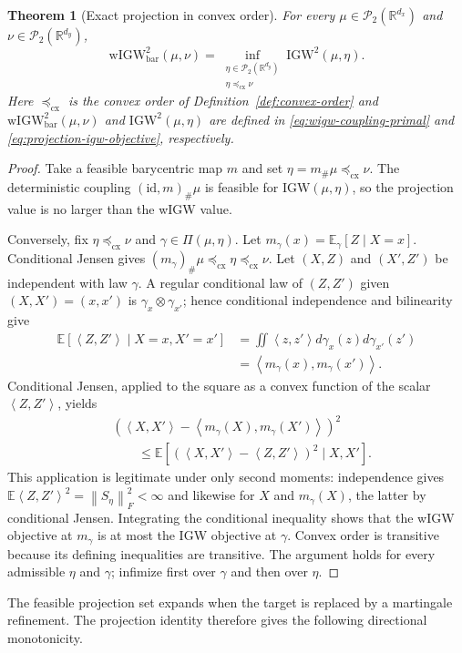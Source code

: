 \documentclass[11pt]{article}
\newcommand{\R}{\mathbb R}
\newcommand{\E}{\mathbb E}
\newcommand{\cP}{\mathcal P}
\newcommand{\ip}[2]{\left\langle #1,#2\right\rangle}
\newcommand{\norm}[1]{\left\lVert #1\right\rVert}
\newcommand{\cx}{\preceq_{\mathrm{cx}}}
\newcommand{\wIGW}{\mathrm{wIGW}_{\mathrm{bar}}}
\newcommand{\IGW}{\mathrm{IGW}}
\theoremstyle{plain}
\newtheorem{theorem}{Theorem}[section]
\theoremstyle{definition}
\theoremstyle{remark}
\begin{document}
\begin{theorem}[Exact projection in convex order]\label{thm:projection}
For every \(\mu\in\cP_2(\R^{d_x})\) and \(\nu\in\cP_2(\R^{d_y})\),
\[
  \wIGW^2(\mu,\nu)=
  \inf_{\substack{\eta\in\cP_2(\R^{d_y})\\ \eta\cx\nu}}
  \IGW^2(\mu,\eta).
\]
Here $\cx$ is the convex order of Definition~\ref{def:convex-order} and
$\wIGW^2(\mu,\nu)$ and $\IGW^2(\mu,\eta)$ are defined in
\eqref{eq:wigw-coupling-primal} and \eqref{eq:projection-igw-objective},
respectively.
\end{theorem}

\begin{proof}
Take a feasible barycentric map \(m\) and set \(\eta=m_\#\mu\cx\nu\). The
deterministic coupling \((\mathrm{id},m)_\#\mu\) is feasible for
\(\IGW(\mu,\eta)\), so the projection value is no larger than the wIGW value.

Conversely, fix \(\eta\cx\nu\) and \(\gamma\in\Pi(\mu,\eta)\). Let
\(m_\gamma(x)=\E_\gamma[Z\mid X=x]\). Conditional Jensen gives
\((m_\gamma)_\#\mu\cx\eta\cx\nu\). Let \((X,Z)\) and \((X',Z')\) be
independent with law \(\gamma\). A regular conditional law of $(Z,Z')$ given
$(X,X')=(x,x')$ is $\gamma_x\otimes\gamma_{x'}$; hence conditional independence
and bilinearity give
\[
\begin{aligned}
  \E[\ip{Z}{Z'}\mid X=x,X'=x']
  &=\iint\ip{z}{z'}d\gamma_x(z)d\gamma_{x'}(z')\\
  &=\ip{m_\gamma(x)}{m_\gamma(x')}.
\end{aligned}
\]
Conditional Jensen, applied to the square as a convex function of the scalar
\(\ip{Z}{Z'}\), yields
\[
\begin{aligned}
  &\left(\ip{X}{X'}-\ip{m_\gamma(X)}{m_\gamma(X')}\right)^2\\
  &\qquad\le
  \E\left[\left(\ip{X}{X'}-\ip{Z}{Z'}\right)^2\mid X,X'\right].
\end{aligned}
\]
This application is legitimate under only second moments: independence gives
$\E\ip{Z}{Z'}^2=\norm{S_\eta}_F^2<\infty$ and likewise for $X$ and
$m_\gamma(X)$, the latter by conditional Jensen. Integrating the conditional
inequality shows that the wIGW objective at $m_\gamma$ is at most the IGW
objective at $\gamma$. Convex order is transitive because its defining inequalities
are transitive. The argument holds for every admissible $\eta$ and $\gamma$;
infimize first over $\gamma$ and then over $\eta$.
\end{proof}

The feasible projection set expands when the target is replaced by a martingale
refinement. The projection identity therefore gives the following directional
monotonicity.
\end{document}
